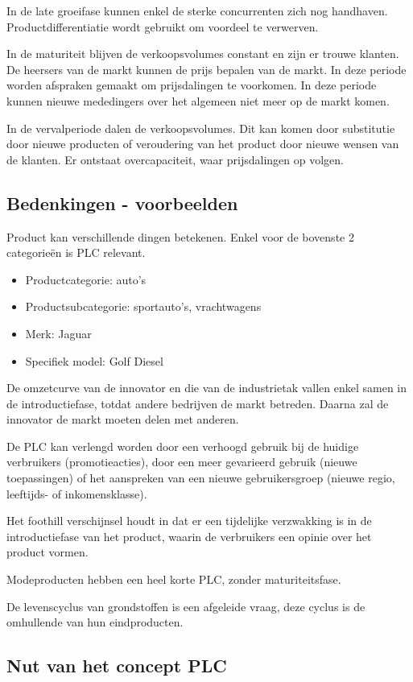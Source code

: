 \documentclass[../../samenvatting.tex]{subfiles}
\begin{document}
In de late groeifase kunnen enkel de sterke concurrenten zich nog handhaven. Productdifferentiatie wordt gebruikt om voordeel te verwerven.

In de maturiteit blijven de verkoopsvolumes constant en zijn er trouwe klanten. De heersers van de markt kunnen de prijs bepalen van de markt. In deze periode worden afspraken gemaakt om prijsdalingen te voorkomen. In deze periode kunnen nieuwe mededingers over het algemeen niet meer op de markt komen.

In de vervalperiode dalen de verkoopsvolumes. Dit kan komen door substitutie door nieuwe producten of veroudering van het product door nieuwe wensen van de klanten. Er ontstaat overcapaciteit, waar prijsdalingen op volgen.

\subsection{Bedenkingen - voorbeelden}

Product kan verschillende dingen betekenen. Enkel voor de bovenste 2 categorieën is PLC relevant.
\begin{itemize}
    \item Productcategorie: auto's
    \item Productsubcategorie: sportauto's, vrachtwagens
    \item Merk: Jaguar
    \item Specifiek model: Golf Diesel
\end{itemize}

De omzetcurve van de innovator en die van de industrietak vallen enkel samen in de introductiefase, totdat andere bedrijven de markt betreden. Daarna zal de innovator de markt moeten delen met anderen.

De PLC kan verlengd worden door een verhoogd gebruik bij de huidige verbruikers (promotieacties), door een meer gevarieerd gebruik (nieuwe toepassingen) of het aanspreken van een nieuwe gebruikersgroep (nieuwe regio, leeftijds- of inkomensklasse).

Het foothill verschijnsel houdt in dat er een tijdelijke verzwakking is in de introductiefase van het product, waarin de verbruikers een opinie over het product vormen.

Modeproducten hebben een heel korte PLC, zonder maturiteitsfase.

De levenscyclus van grondstoffen is een afgeleide vraag, deze cyclus is de omhullende van hun eindproducten.

\subsection{Nut van het concept PLC}
\end{document}
